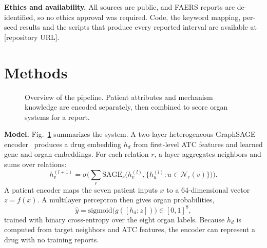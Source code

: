 \documentclass[conference,letterpaper]{IEEEtran}
\begin{document}
\textbf{Ethics and availability.} All sources are public, and FAERS reports are de-identified, so no ethics approval was required. Code, the keyword mapping, per-seed results and the scripts that produce every reported interval are available at [repository URL].

\section{Methods}
\begin{figure}[t]
\centering
{}
\caption{Overview of the pipeline. Patient attributes and mechanism knowledge are encoded separately, then combined to score organ systems for a report.}
\label{fig:pipe}
\end{figure}

\textbf{Model.} Fig.~\ref{fig:pipe} summarizes the system. A two-layer heterogeneous GraphSAGE encoder~\cite{hamilton2017} produces a drug embedding $h_d$ from first-level ATC features and learned gene and organ embeddings. For each relation $r$, a layer aggregates neighbors and sums over relations:
\begin{equation}
h_v^{(l+1)} = \sigma\Big(\sum_{r} \mathrm{SAGE}_r\big(h_v^{(l)}, \{h_u^{(l)} : u \in \mathcal{N}_r(v)\}\big)\Big).
\end{equation}
A patient encoder maps the seven patient inputs $x$ to a 64-dimensional vector $z=f(x)$. A multilayer perceptron then gives organ probabilities,
\begin{equation}
\hat{y} = \mathrm{sigmoid}\big(g([h_d; z])\big) \in [0,1]^8,
\end{equation}
trained with binary cross-entropy over the eight organ labels. Because $h_d$ is computed from target neighbors and ATC features, the encoder can represent a drug with no training reports.
\end{document}
